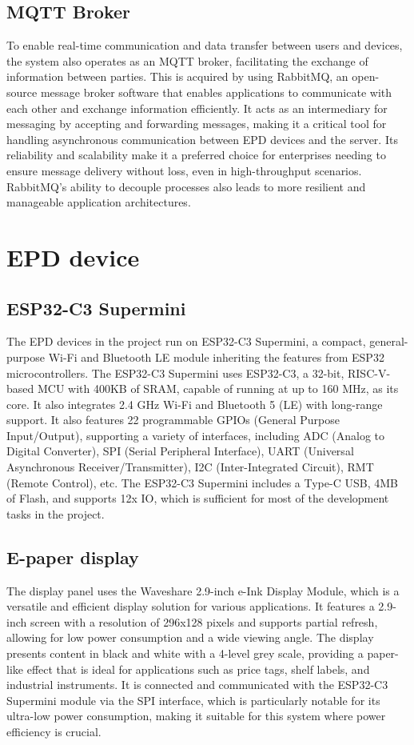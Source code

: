 \documentclass[../Main.tex]{subfiles}
\begin{document}
\subsection{MQTT Broker}
To enable real-time communication and data transfer between users and devices, the system also operates as an MQTT broker, facilitating the exchange of information between parties. This is acquired by using RabbitMQ, an open-source message broker software that enables applications to communicate with each other and exchange information efficiently. It acts as an intermediary for messaging by accepting and forwarding messages, making it a critical tool for handling asynchronous communication between \gls{EPD} devices and the server. Its reliability and scalability make it a preferred choice for enterprises needing to ensure message delivery without loss, even in high-throughput scenarios. RabbitMQ's ability to decouple processes also leads to more resilient and manageable application architectures.

\section{EPD device}
\subsection{ESP32-C3 Supermini}
The \gls{EPD} devices in the project run on ESP32-C3 Supermini, a compact, general-purpose Wi-Fi and Bluetooth LE module inheriting the features from ESP32 microcontrollers. The ESP32-C3 Supermini uses ESP32-C3, a 32-bit, RISC-V-based MCU with 400KB of SRAM, capable of running at up to 160 MHz, as its core. It also integrates 2.4 GHz Wi-Fi and Bluetooth 5 (LE) with long-range support. It also features 22 programmable GPIOs (General Purpose Input/Output), supporting a variety of interfaces, including ADC (Analog to Digital Converter), SPI (Serial Peripheral Interface), UART (Universal Asynchronous Receiver/Transmitter), I2C (Inter-Integrated Circuit), RMT (Remote Control), etc. The ESP32-C3 Supermini includes a Type-C USB, 4MB of Flash, and supports 12x IO, which is sufficient for most of the development tasks in the project.

\subsection{E-paper display}

The display panel uses the Waveshare 2.9-inch e-Ink Display Module, which is a versatile and efficient display solution for various applications. It features a 2.9-inch screen with a resolution of 296x128 pixels and supports partial refresh, allowing for low power consumption and a wide viewing angle. The display presents content in black and white with a 4-level grey scale, providing a paper-like effect that is ideal for applications such as price tags, shelf labels, and industrial instruments. It is connected and communicated with the ESP32-C3 Supermini module via the SPI interface, which is particularly notable for its ultra-low power consumption, making it suitable for this system where power efficiency is crucial.
\end{document}
